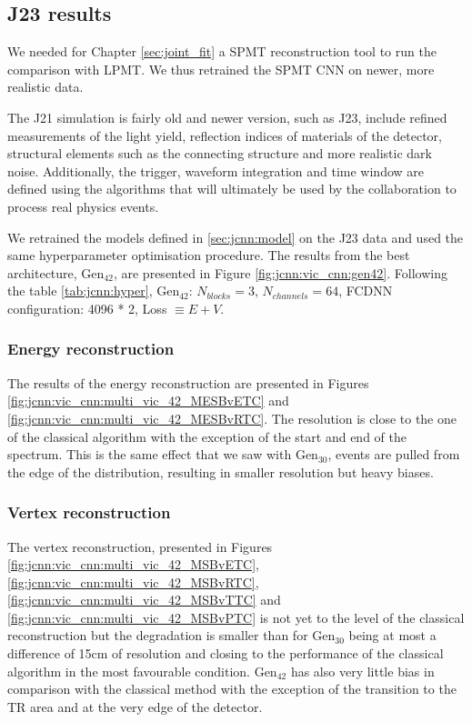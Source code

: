 \documentclass[../main.tex]{subfiles}
\begin{document}
\subsection{J23 results}

We needed for Chapter \ref{sec:joint_fit} a SPMT reconstruction tool to run the comparison with LPMT. We thus retrained the SPMT CNN on newer, more realistic data.

The J21 simulation is fairly old and newer version, such as J23, include refined measurements of the light yield, reflection indices of materials of the detector, structural elements such as the connecting structure and more realistic dark noise. Additionally, the trigger, waveform integration and time window are defined using the algorithms that will ultimately be used by the collaboration to process real physics events.

We retrained the models defined in \ref{sec:jcnn:model} on the J23 data and used the same hyperparameter optimisation procedure. The results from the best architecture, $\mathrm{Gen}_{42}$, are presented in Figure \ref{fig:jcnn:vic_cnn:gen42}. Following the table \ref{tab:jcnn:hyper}, $\mathrm{Gen}_{42}$: $N_{blocks} = 3$, $N_{channels} = 64$, FCDNN configuration: 4096 * 2, Loss $\equiv E+V$.

\subsubsection{Energy reconstruction}

The results of the energy reconstruction are presented in Figures \ref{fig:jcnn:vic_cnn:multi_vic_42_MESBvETC} and \ref{fig:jcnn:vic_cnn:multi_vic_42_MESBvRTC}. The resolution is close to the one of the classical algorithm with the exception of the start and end of the spectrum. This is the same effect that we saw with $\mathrm{Gen}_{30}$, events are pulled from the edge of the distribution, resulting in smaller resolution but heavy biases.

\subsubsection{Vertex reconstruction}

The vertex reconstruction, presented in Figures \ref{fig:jcnn:vic_cnn:multi_vic_42_MSBvETC}, \ref{fig:jcnn:vic_cnn:multi_vic_42_MSBvRTC}, \ref{fig:jcnn:vic_cnn:multi_vic_42_MSBvTTC} and \ref{fig:jcnn:vic_cnn:multi_vic_42_MSBvPTC} is not yet to the level of the classical reconstruction but the degradation is smaller than for $\mathrm{Gen}_{30}$ being at most a difference of 15cm of resolution and closing to the performance of the classical algorithm in the most favourable condition. $\mathrm{Gen}_{42}$ has also very little bias in comparison with the classical method with the exception of the transition to the TR area and at the very edge of the detector.
\end{document}
